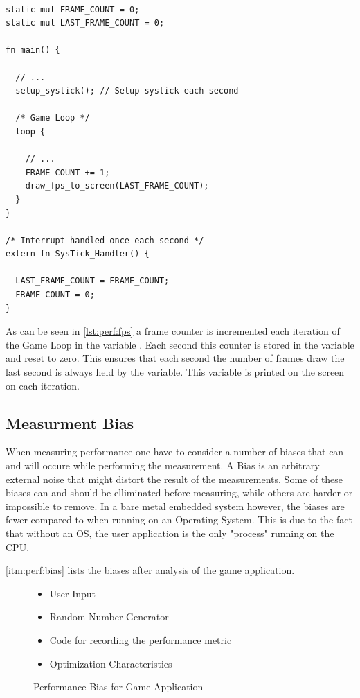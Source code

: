 \begin{listing}[H]
  \begin{verbatim}

static mut FRAME_COUNT = 0;
static mut LAST_FRAME_COUNT = 0;

fn main() {

  // ...
  setup_systick(); // Setup systick each second

  /* Game Loop */
  loop {

    // ...
    FRAME_COUNT += 1;
    draw_fps_to_screen(LAST_FRAME_COUNT);
  }
}

/* Interrupt handled once each second */
extern fn SysTick_Handler() {

  LAST_FRAME_COUNT = FRAME_COUNT;
  FRAME_COUNT = 0;
}
  \end{verbatim}
  \caption{}
  \label{lst:perf:fps}
\end{listing}

As can be seen in \autoref{lst:perf:fps} a frame counter is incremented each iteration of the Game Loop in the variable .
Each second this counter is stored in the  variable and reset to zero.
This ensures that each second the number of frames draw the last second is always held by the  variable.
This variable is printed on the screen on each iteration.

\subsection{Measurment Bias}
\label{sec:perf:bias}

When measuring performance one have to consider a number of biases that can and will occure while performing the measurement.
A Bias is an arbitrary external noise that might distort the result of the measurements.
Some of these biases can and should be elliminated before measuring, while others are harder or impossible to remove.
In a bare metal embedded system however, the biases are fewer compared to when running on an Operating System.
This is due to the fact that without an OS, the user application is the only "process" running on the CPU.

\autoref{itm:perf:bias} lists the biases after analysis of the game application.
\begin{figure}[H]
	\begin{itemize}
	\item User Input
	\item Random Number Generator
	\item Code for recording the performance metric
	\item Optimization Characteristics
	\end{itemize}
	\caption{Performance Bias for Game Application}
	\label{itm:perf:bias}
\end{figure}

